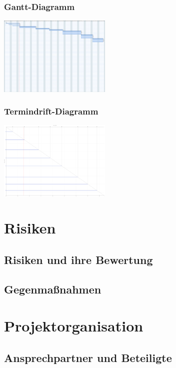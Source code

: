\documentclass[11pt]{article}
\begin{document}
\subsubsection{Gantt-Diagramm}
\begin{center}
	\includegraphics[width=0.4\textwidth]{Tourney.png}
\end{center}
\subsubsection{Termindrift-Diagramm}
\begin{center}
	\includegraphics[width=0.4\textwidth]{TourneyTerminDrift.png}
\end{center}
\section{Risiken}

\subsection{Risiken und ihre Bewertung}

\subsection{Gegenmaßnahmen}

\section{Projektorganisation}

\subsection{Ansprechpartner und Beteiligte}
\end{document}
